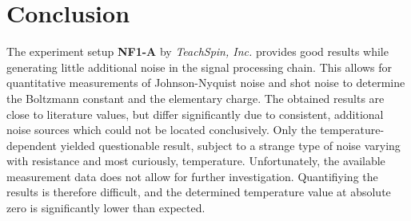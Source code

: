 \documentclass[
    parskip=half, 
    twoside=false,
    twocolumn=true,
    fontsize=11pt,
]{scrarticle}
\begin{document}
\section{Conclusion}
The experiment setup \textbf{NF1-A} by \textit{TeachSpin, Inc.} provides good results while generating little additional noise in the signal processing chain. This allows for quantitative measurements of Johnson-Nyquist noise and shot noise to determine the Boltzmann constant and the elementary charge. The obtained results are close to literature values, but differ significantly due to consistent, additional noise sources which could not be located conclusively. Only the temperature-dependent yielded questionable result, subject to a strange type of noise varying with resistance and most curiously, temperature. Unfortunately, the available measurement data does not allow for further investigation. Quantifiying the results is therefore difficult, and the determined temperature value at absolute zero is significantly lower than expected.

\nocite{*}
\printbibliography
\end{document}
